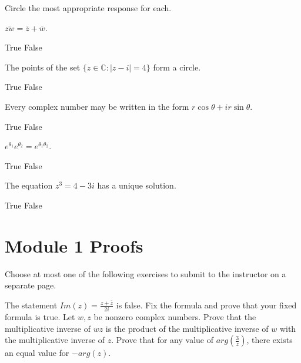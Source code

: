 \documentclass[13pt]{exam}
\begin{document}
Circle the most appropriate response for each.

\begin{questions}

\setcounter{question}{5}

\question \(\overline{zw}=\overline{z}+\overline{w}\). 
\begin{choices}
\choice True
\choice False
\end{choices}

\question The points of the set \(\{z\in\mathbb C:|z-i|=4\}\) form a circle. 
\begin{choices}
\choice True
\choice False
\end{choices}

\question Every complex number may be written in the form \(r\cos\theta+ir\sin\theta\). 
\begin{choices}
\choice True
\choice False
\end{choices}

\question \(e^{\theta_1}e^{\theta_2}=e^{\theta_1\theta_2}\). 
\begin{choices}
\choice True
\choice False
\end{choices}

\question The equation \(z^3=4-3i\) has a unique solution. 
\begin{choices}
\choice True
\choice False
\end{choices}
\end{questions}

\section*{Module 1 Proofs}

Choose at most one of the following exercises to submit to the instructor
on a separate page.

\begin{questions}

\setcounter{question}{10}

\question The statement \(Im(z)=\frac{z+\overline{z}}{2i}\) is false. Fix the formula
  and prove that your fixed formula is true. 
\question Let \(w,z\) be nonzero complex numbers. Prove that the multiplicative inverse of
  \(wz\) is the product of the multiplicative inverse of \(w\) with the multiplicative
  inverse of \(z\).
\question Prove that for any value of \(arg(\frac{3}{z})\), there exists an equal value
  for \(-arg(z)\).

\end{questions}
\end{document}
